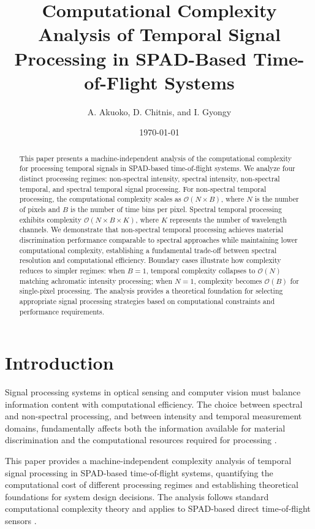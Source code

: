 \documentclass[10pt,twocolumn]{article}
\title{Computational Complexity Analysis of Temporal Signal Processing in SPAD-Based Time-of-Flight Systems}
\author{A. Akuoko, D. Chitnis, and I. Gyongy}
\date{\today}
\begin{document}
\maketitle

\begin{abstract}
This paper presents a machine-independent analysis of the computational complexity for processing temporal signals in SPAD-based time-of-flight systems. We analyze four distinct processing regimes: non-spectral intensity, spectral intensity, non-spectral temporal, and spectral temporal signal processing. For non-spectral temporal processing, the computational complexity scales as $\mathcal{O}(N \times B)$, where $N$ is the number of pixels and $B$ is the number of time bins per pixel. Spectral temporal processing exhibits complexity $\mathcal{O}(N \times B \times K)$, where $K$ represents the number of wavelength channels. We demonstrate that non-spectral temporal processing achieves material discrimination performance comparable to spectral approaches while maintaining lower computational complexity, establishing a fundamental trade-off between spectral resolution and computational efficiency. Boundary cases illustrate how complexity reduces to simpler regimes: when $B = 1$, temporal complexity collapses to $\mathcal{O}(N)$ matching achromatic intensity processing; when $N = 1$, complexity becomes $\mathcal{O}(B)$ for single-pixel processing. The analysis provides a theoretical foundation for selecting appropriate signal processing strategies based on computational constraints and performance requirements.
\end{abstract}

\section{Introduction}

Signal processing systems in optical sensing and computer vision must balance information content with computational efficiency. The choice between spectral and non-spectral processing, and between intensity and temporal measurement domains, fundamentally affects both the information available for material discrimination and the computational resources required for processing \cite{su2016,becker2023,heinz2001}.

This paper provides a machine-independent complexity analysis of temporal signal processing in SPAD-based time-of-flight systems, quantifying the computational cost of different processing regimes and establishing theoretical foundations for system design decisions. The analysis follows standard computational complexity theory \cite{knuth1976} and applies to SPAD-based direct time-of-flight sensors \cite{piron2020,gyongy2022}.
\end{document}
